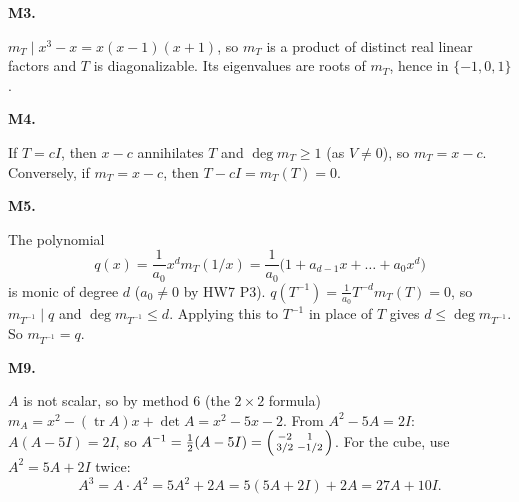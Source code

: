 \documentclass[10pt]{scrartcl}
\DeclareMathOperator{\tr}{tr}\DeclareMathOperator{\nul}{null}\DeclareMathOperator{\range}{range}\DeclareMathOperator{\spn}{span}
\begin{document}
\begin{prob}
\textbf{M3. }\par 
{}
$m_T\mid x^3-x=x(x-1)(x+1)$, so $m_T$ is a product of distinct real linear factors and $T$ is diagonalizable. Its eigenvalues are roots of $m_T$, hence in $\{-1,0,1\}$.
\end{prob}

\begin{prob}
\textbf{M4. }\par 
{}
If $T=cI$, then $x-c$ annihilates $T$ and $\deg m_T\ge1$ (as $V\ne0$), so $m_T=x-c$. Conversely, if $m_T=x-c$, then $T-cI=m_T(T)=0$.
\end{prob}

\begin{prob}
\textbf{M5. }\par 
{}
The polynomial \[ q(x)=\frac1{a_0}x^dm_T(1/x)=\frac1{a_0}\big(1+a_{d-1}x+\dots+a_0x^d\big) \] is monic of degree $d$ ($a_0\ne0$ by HW7 P3). $q(T^{-1})=\frac1{a_0}T^{-d}m_T(T)=0$, so $m_{T^{-1}}\mid q$ and $\deg m_{T^{-1}}\le d$. Applying this to $T^{-1}$ in place of $T$ gives $d\le\deg m_{T^{-1}}$. So $m_{T^{-1}}=q$.
\end{prob}

\begin{prob}
\textbf{M9. }\par 
{}
$A$ is not scalar, so by method 6 (the $2\times2$ formula) $m_A=x^2-(\tr A)x+\det A=x^2-5x-2$. From $A^2-5A=2I$: $A(A-5I)=2I$, so $A^{-1}=\frac12(A-5I)=\begin{psmallmatrix}-2&1\\3/2&-1/2\end{psmallmatrix}$. For the cube, use $A^2=5A+2I$ twice:
\[ A^3=A\cdot A^2=5A^2+2A=5(5A+2I)+2A=27A+10I. \]
\end{prob}
\end{document}
